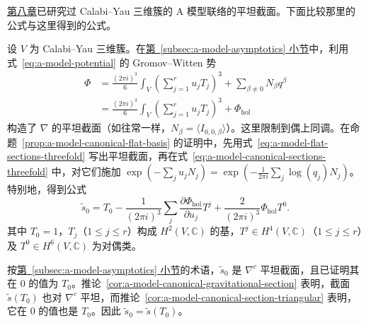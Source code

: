\hyperref[chap:quantum-cohomology]{第八章}已研究过 Calabi--Yau 三维簇的 A 模型联络的平坦截面。下面比较那里的公式与这里得到的公式。
\begin{example}\label{ex:threefold-flat-section-comparison}
设 $V$ 为 Calabi--Yau 三维簇。在\hyperref[subsec:a-model-asymptotics]{第~\ref*{subsec:a-model-asymptotics} 小节}中，利用式~\eqref{eq:a-model-potential} 的 Gromov--Witten 势
\[
\begin{aligned}
\Phi&=\frac{(2\pi i)^3}{6}\int_V\left(\sum_{j=1}^ru_jT_j\right)^3
+\sum_{\beta\ne0}N_\beta q^\beta\\
&=\frac{(2\pi i)^3}{6}\int_V\left(\sum_{j=1}^ru_jT_j\right)^3+\Phi_{\mathrm{hol}}
\end{aligned}
\]
构造了 $\nabla$ 的平坦截面（如往常一样，$N_\beta=\langle I_{0,0,\beta}\rangle$）。这里限制到偶上同调。在命题~\ref{prop:a-model-canonical-flat-basis} 的证明中，先用式~\eqref{eq:a-model-flat-sections-threefold} 写出平坦截面，再在式~\eqref{eq:a-model-canonical-sections-threefold} 中，对它们施加 $\exp(-\sum_j u_jN_j)=\exp(-\frac1{2\pi i}\sum_j\log(q_j)N_j)$。特别地，得到公式
\begin{equation}\label{eq:threefold-canonical-unit-potential}
\widetilde s_0=T_0-\frac1{(2\pi i)^3}\sum_j
\frac{\partial\Phi_{\mathrm{hol}}}{\partial u_j}T^j
+\frac2{(2\pi i)^3}\Phi_{\mathrm{hol}}T^0.
\end{equation}
其中 $T_0=1$，$T_j$（$1\le j\le r$）构成 $H^2(V,\mathbb C)$ 的基，$T^j\in H^4(V,\mathbb C)$（$1\le j\le r$）及 $T^0\in H^6(V,\mathbb C)$ 为对偶类。

按\hyperref[subsec:a-model-asymptotics]{第~\ref*{subsec:a-model-asymptotics} 小节}的术语，$\widetilde s_0$ 是 $\nabla^c$ 平坦截面，且已证明其在 $0$ 的值为 $T_0$。推论~\ref{cor:a-model-canonical-gravitational-section} 表明，截面 $\widetilde s(T_0)$ 也对 $\nabla^c$ 平坦，而推论~\ref{cor:a-model-canonical-section-triangular} 表明，它在 $0$ 的值也是 $T_0$。因此 $\widetilde s_0=\widetilde s(T_0)$。


\end{example}
